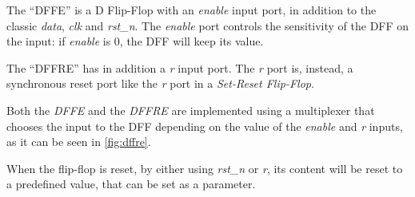 The ``DFFE'' is a D Flip-Flop with an \emph{enable} input port, 
in addition to the classic \emph{data}, \emph{clk} and \emph{rst\_n}.
The \emph{enable} port controls the sensitivity of the DFF on the input: if 
\emph{enable} is 0, the DFF will keep its value. 

The ``DFFRE'' has in addition a \emph{r} input port. The \emph{r} port is, instead,
a synchronous reset port like the \emph{r} port in a \emph{Set-Reset Flip-Flop}.

Both the \emph{DFFE} and the \emph{DFFRE} are implemented using a multiplexer that 
chooses the input to the DFF depending on the value of the \emph{enable} and 
\emph{r} inputs, as it can be seen in \cref{fig:dffre}.

When the flip-flop is reset, by either using \emph{rst\_n} or \emph{r}, its 
content will be reset to a predefined value, that can be set as a parameter.